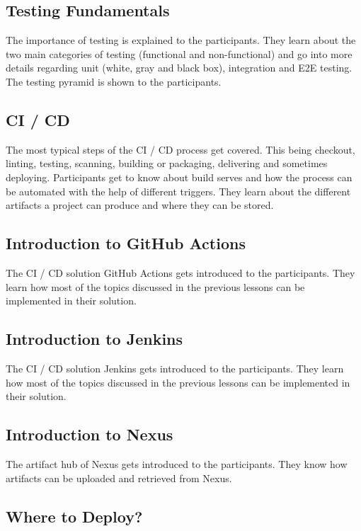 \documentclass{article}
\begin{document}
\subsection{Testing Fundamentals}

The importance of testing is explained to the participants. They learn about the
two main categories of testing (functional and non-functional) and go into more
details regarding unit (white, gray and black box), integration and E2E testing.
The testing pyramid is shown to the participants.

\subsection{CI / CD}

The most typical steps of the CI / CD process get covered. This being checkout,
linting, testing, scanning, building or packaging, delivering and sometimes
deploying. Participants get to know about build serves and how the process can
be automated with the help of different triggers. They learn about the different
artifacts a project can produce and where they can be stored.

\subsection{Introduction to GitHub Actions}

The CI / CD solution GitHub Actions gets introduced to the participants. They
learn how most of the topics discussed in the previous lessons can be
implemented in their solution.

\subsection{Introduction to Jenkins}

The CI / CD solution Jenkins gets introduced to the participants. They learn how
most of the topics discussed in the previous lessons can be implemented in their
solution.

\subsection{Introduction to Nexus}

The artifact hub of Nexus gets introduced to the participants. They know how
artifacts can be uploaded and retrieved from Nexus.

\subsection{Where to Deploy?}
\end{document}
